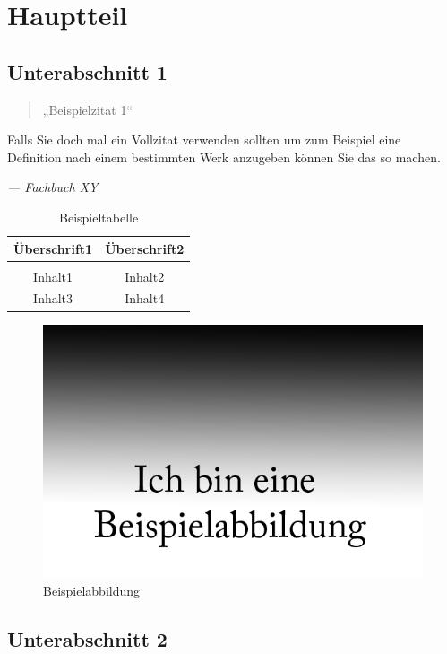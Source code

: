 \section{Hauptteil} %
\subsection{Unterabschnitt 1}
\begin{quote}
	„Beispielzitat 1“ \cite{knuth:1984} \cite{IEEEexample:texfaq}
\end{quote}

\begin{formal}
	Falls Sie doch mal ein Vollzitat verwenden sollten um zum Beispiel eine Definition nach einem bestimmten Werk anzugeben können Sie das so machen.
	\begin{flushright}
		\textit{--- Fachbuch XY \cite{IEEEexample:texfaq}}
	\end{flushright}
\end{formal}

\begin{table}[H]
	\centering
	\caption{Beispieltabelle}
	\begin{tabular}{c | c}
		\hline 
		\large{Überschrift1} & \large{Überschrift2} \\
		\hline \\
		Inhalt1 & Inhalt2\\
		Inhalt3 & Inhalt4\\
	\end{tabular}

\end{table}

\begin{figure}[H]
	\centering	
	\includegraphics[width=.5\textwidth]{img/sample}
	\caption[Beispielabbildung]{Beispielabbildung}
	\label{fig:Sample}
\end{figure}
\subsection{Unterabschnitt 2}
\Blindtext
